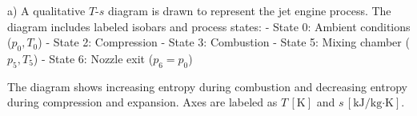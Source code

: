 a) A qualitative \( T \)-\( s \) diagram is drawn to represent the jet engine process. The diagram includes labeled isobars and process states:  
- State 0: Ambient conditions (\( p_0, T_0 \))  
- State 2: Compression  
- State 3: Combustion  
- State 5: Mixing chamber (\( p_5, T_5 \))  
- State 6: Nozzle exit (\( p_6 = p_0 \))  

The diagram shows increasing entropy during combustion and decreasing entropy during compression and expansion. Axes are labeled as \( T \, [\text{K}] \) and \( s \, [\text{kJ/kg·K}] \).